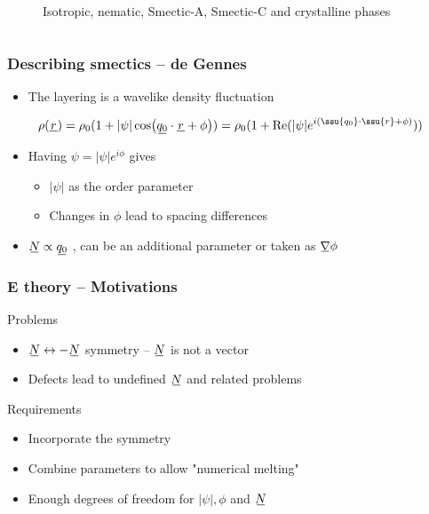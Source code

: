\documentclass[10pt,mathserif]{beamer}
\begin{document}
\begin{frame}
\begin{columns}
\begin{column}{0.49\textwidth}
\begin{figure}
                \caption{Isotropic, nematic, Smectic-A, Smectic-C and crystalline phases}
            \end{figure}
        \end{column}
    \end{columns}
\end{frame}

\begin{frame}
    \frametitle{Describing smectics -- de Gennes}
    \begin{itemize}
        \item The layering is a wavelike density fluctuation
    \end{itemize}
    \begin{align*}
        \rho(\su{r}) = \rho_0(1 + |\psi|\cos(\su{q_0}\cdot\su{r} + \phi)) = \rho_0(1 + \Re(|\psi| e^{i(\ssu{q_0} \cdot \ssu{r} + \phi)}))
    \end{align*}
    \begin{itemize}
        \item Having $\psi = |\psi|e^{i\phi}$ gives
            \begin{itemize}
                \item $|\psi|$ as the order parameter
                \item Changes in $\phi$ lead to spacing differences
            \end{itemize}
        \item $\su{N} \propto \su{q_0}$ \color{gray}, can be an additional parameter or taken as $\su{\nabla} \phi$ \normalcolor
    \end{itemize}
\end{frame}

\begin{frame}
    \frametitle{E theory -- Motivations}
    \large
    Problems
    \normalsize
    \begin{itemize}
        \item $\su{N} \leftrightarrow -\su{N}$ symmetry -- $\su{N}$ is not a vector
        \item Defects lead to undefined $\su{N}$ \color{gray} and related problems \normalcolor
    \end{itemize}

    \vspace{3em}

    \large
    Requirements
    \normalsize
    \begin{itemize}
        \item Incorporate the symmetry
        \item Combine parameters to allow "numerical melting"
        \item Enough degrees of freedom for $|\psi|, \phi$ and $\su{N}$
    \end{itemize}
\end{frame}
\end{document}
